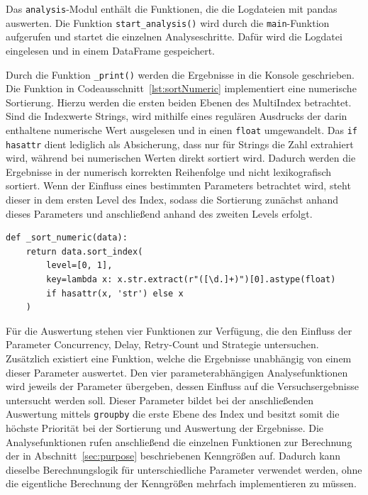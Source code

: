 
Das \texttt{analysis}-Modul enthält die Funktionen, die die Logdateien mit pandas auswerten.
Die Funktion \texttt{start\_analysis()} wird durch die \texttt{main}-Funktion aufgerufen und startet die einzelnen
Analyseschritte.
Dafür wird die Logdatei eingelesen und in einem DataFrame gespeichert.

Durch die Funktion \texttt{\_print()} werden die Ergebnisse in die Konsole geschrieben.
Die Funktion in Codeausschnitt~\ref{lst:sortNumeric} implementiert eine numerische Sortierung.
Hierzu werden die ersten beiden Ebenen des MultiIndex betrachtet.
Sind die Indexwerte Strings, wird mithilfe eines regulären Ausdrucks der darin enthaltene numerische Wert
ausgelesen und in einen \texttt{float} umgewandelt.
Das \texttt{if hasattr} dient lediglich als Absicherung, dass nur für Strings die Zahl extrahiert wird, während bei
numerischen Werten direkt sortiert wird.
Dadurch werden die Ergebnisse in der numerisch korrekten Reihenfolge und nicht lexikografisch sortiert.
Wenn der Einfluss eines bestimmten Parameters betrachtet wird, steht dieser in dem ersten Level des Index, sodass die
Sortierung zunächst anhand dieses Parameters und anschließend anhand des zweiten Levels erfolgt.

\begin{lstlisting}[style=pythoncode, caption={Numerische Sortierung der Ergebnisse}, label={lst:sortNumeric}]
def _sort_numeric(data):
    return data.sort_index(
        level=[0, 1],
        key=lambda x: x.str.extract(r"([\d.]+)")[0].astype(float)
		if hasattr(x, 'str') else x
    )
\end{lstlisting}

Für die Auswertung stehen vier Funktionen zur Verfügung, die den Einfluss der Parameter Concurrency, Delay, Retry-Count
und Strategie untersuchen.
Zusätzlich existiert eine Funktion, welche die Ergebnisse unabhängig von einem dieser Parameter auswertet.
Den vier parameterabhängigen Analysefunktionen wird jeweils der Parameter übergeben, dessen Einfluss auf die
Versuchsergebnisse untersucht werden soll.
Dieser Parameter bildet bei der anschließenden Auswertung mittels \texttt{groupby} die erste Ebene des Index und
besitzt somit die höchste Priorität bei der Sortierung und Auswertung der Ergebnisse.
Die Analysefunktionen rufen anschließend die einzelnen Funktionen zur Berechnung der in Abschnitt~\ref{sec:purpose}
beschriebenen Kenngrößen auf.
Dadurch kann dieselbe Berechnungslogik für unterschiedliche Parameter verwendet werden, ohne die eigentliche Berechnung
der Kenngrößen mehrfach implementieren zu müssen.

